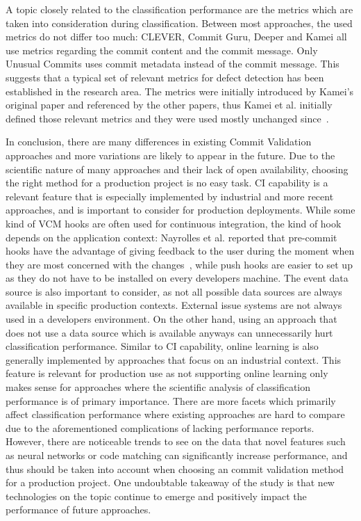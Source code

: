 A topic closely related to the classification performance are the metrics which are taken into consideration during classification. Between most approaches, the used metrics do not differ too much: CLEVER, Commit Guru, Deeper and Kamei all use metrics regarding the commit content and the commit message. Only Unusual Commits uses commit metadata instead of the commit message. This suggests that a typical set of relevant metrics for defect detection has been established in the research area. The metrics were initially introduced by Kamei's original paper and referenced by the other papers, thus Kamei et al. initially defined those relevant metrics and they were used mostly unchanged since~\cite{Kamei2013}.

In conclusion, there are many differences in existing Commit Validation approaches and more variations are likely to appear in the future. Due to the scientific nature of many approaches and their lack of open availability, choosing the right method for a production project is no easy task.
%
CI capability is a relevant feature that is especially implemented by industrial and more recent approaches, and is important to consider for production deployments. While some kind of VCM hooks are often used for continuous integration, the kind of hook depends on the application context: Nayrolles et al. reported that pre-commit hooks have the advantage of giving feedback to the user during the moment when they are most concerned with the changes~\cite{Nayrolles2018}, while push hooks are easier to set up as they do not have to be installed on every developers machine.
The event data source is also important to consider, as not all possible data sources are always available in specific production contexts. External issue systems are not always used in a developers environment.
On the other hand, using an approach that does not use a data source which is available anyways can unnecessarily hurt classification performance.
%
Similar to CI capability, online learning is also generally implemented by approaches that focus on an industrial context. This feature is relevant for production use as not supporting online learning only makes sense for approaches where the scientific analysis of classification performance is of primary importance.
%
%
There are more facets which primarily affect classification performance where existing approaches are hard to compare due to the aforementioned complications of lacking performance reports. However, there are noticeable trends to see on the data that novel features such as neural networks or code matching can significantly increase performance, and thus should be taken into account when choosing an commit validation method for a production project. One undoubtable takeaway of the study is that new technologies on the topic continue to emerge and positively impact the performance of future approaches. 




